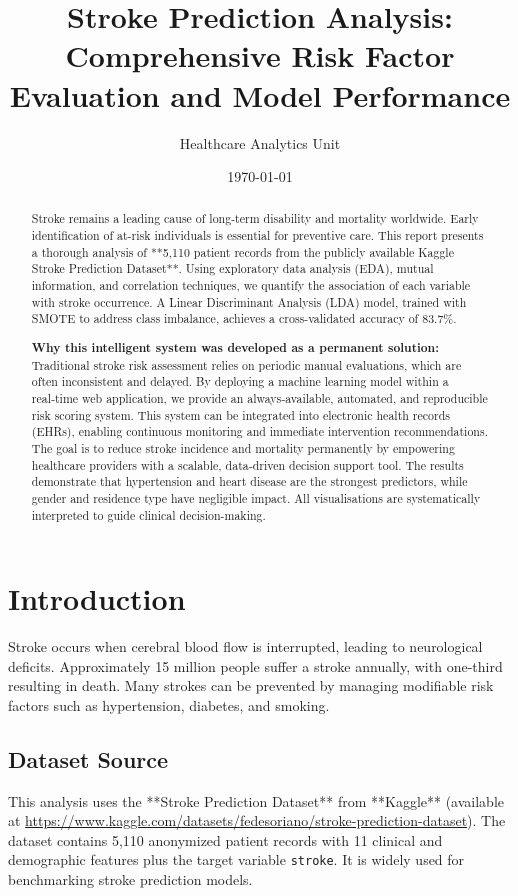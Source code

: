\documentclass[12pt,a4paper]{article}
\title{Stroke Prediction Analysis: Comprehensive Risk Factor Evaluation and Model Performance}
\author{Healthcare Analytics Unit}
\date{\today}
\begin{document}
\maketitle

\begin{abstract}
Stroke remains a leading cause of long-term disability and mortality worldwide. Early identification of at-risk individuals is essential for preventive care. This report presents a thorough analysis of **5,110 patient records from the publicly available Kaggle Stroke Prediction Dataset**. Using exploratory data analysis (EDA), mutual information, and correlation techniques, we quantify the association of each variable with stroke occurrence. A Linear Discriminant Analysis (LDA) model, trained with SMOTE to address class imbalance, achieves a cross-validated accuracy of 83.7\%. 

\textbf{Why this intelligent system was developed as a permanent solution:} Traditional stroke risk assessment relies on periodic manual evaluations, which are often inconsistent and delayed. By deploying a machine learning model within a real‑time web application, we provide an always‑available, automated, and reproducible risk scoring system. This system can be integrated into electronic health records (EHRs), enabling continuous monitoring and immediate intervention recommendations. The goal is to reduce stroke incidence and mortality permanently by empowering healthcare providers with a scalable, data‑driven decision support tool. The results demonstrate that hypertension and heart disease are the strongest predictors, while gender and residence type have negligible impact. All visualisations are systematically interpreted to guide clinical decision-making.
\end{abstract}

\newpage
\tableofcontents
\newpage

\section{Introduction}
Stroke occurs when cerebral blood flow is interrupted, leading to neurological deficits. Approximately 15 million people suffer a stroke annually, with one-third resulting in death. Many strokes can be prevented by managing modifiable risk factors such as hypertension, diabetes, and smoking. 

\subsection{Dataset Source}
This analysis uses the **Stroke Prediction Dataset** from **Kaggle** (available at \url{https://www.kaggle.com/datasets/fedesoriano/stroke-prediction-dataset}). The dataset contains 5,110 anonymized patient records with 11 clinical and demographic features plus the target variable \texttt{stroke}. It is widely used for benchmarking stroke prediction models.
\end{document}

